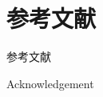 \documentclass[12pt,aspectratio=169]{beamer}
\begin{document}
\section{参考文献}

\begin{frame}[allowframebreaks]{参考文献}
  
  \printbibliography[heading=none]

\end{frame}

\begin{frame}{Acknowledgement}

  \begin{center}

    \textcolor{gray}{\Huge{\centerline{}}}

  \end{center}

\end{frame}
\end{document}
